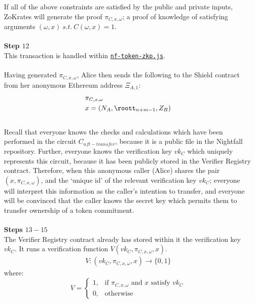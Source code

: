\noindent
If all of the above constraints are satisfied by the public and private inputs, ZoKrates will generate the proof $\pi_{C,x,\omega}$; a proof of knowledge of satisfying arguments $(\omega, x) \ s.t. \ C(\omega, x) = 1$.\\
\\
\textbf{Step $12$}
\ \\
This transaction is handled within \hyperref[sec:nf-token-zkp]{\texttt{nf-token-zkp.js}}.\\
\\
Having generated $\pi_{C,x,\omega}$, Alice then sends the following to the Shield contract from her anonymous Ethereum address $\Xi_{A,1}$:
\begin{align*}
  &\pi_{C,x,\omega}\\
  &x = (N_{A}, \roott_{n+m-1}, Z_B)
\end{align*}
\\
Recall that everyone knows the checks and calculations which have been performed in the circuit $C_{nft-transfer}$, because it is a public file in the Nightfall repository. Further, everyone knows the verification key $vk_C$ which uniquely represents this circuit, because it has been publicly stored in the Verifier Registry contract. Therefore, when this anonymous caller (Alice) shares the pair $(x, \pi_{C,x,\omega})$, and the `unique id' of the relevant verification key $vk_C$; everyone will interpret this information as the caller's intention to transfer, and everyone will be convinced that the caller knows the secret key which permits them to transfer ownership of a token commitment.\\
\\



\textbf{Steps $13 - 15$}
\ \\
The Verifier Registry contract already has stored within it the verification key $vk_C$.
It runs a verification function $V(vk_C, \pi_{C,x,\omega}, x)$.
\begin{align*}
  V: (vk_C, \pi_{C,x,\omega}, x) \to \{0,1\}
\end{align*}
where:
\[
    V=
\begin{cases}
    1,& \text{if } \pi_{C,x,\omega} \text{ and } x \text{ satisfy } vk_C\\
    0,& \text{otherwise}
\end{cases}
\]
\ \\


